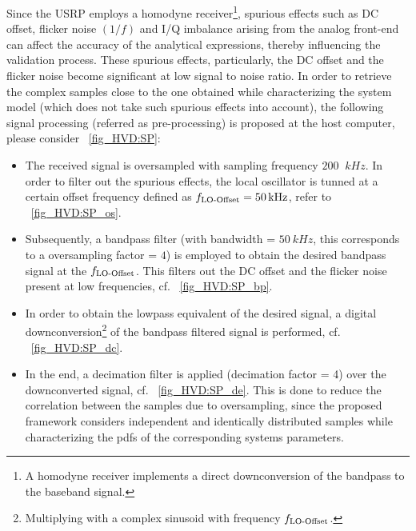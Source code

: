 Since the USRP employs a homodyne receiver\footnote{A homodyne receiver implements a direct downconversion of the bandpass to the baseband signal.}, spurious effects such as DC offset, flicker noise $(1/f)$ and I/Q imbalance arising from the analog front-end can affect the accuracy of the analytical expressions, thereby influencing the validation process. These spurious effects, particularly, the DC offset and the flicker noise become significant at low signal to noise ratio. In order to retrieve the complex samples close to the one obtained while characterizing the system model (which does not take such spurious effects into account), the following signal processing (referred as pre-processing) is proposed at the host computer, please consider \figurename~\ref{fig_HVD:SP}:
\begin{itemize}
\item The received signal is oversampled with sampling frequency $200$ $\SI{}{kHz}$. 
In order to filter out the spurious effects, the local oscillator is tunned at a certain offset frequency defined as $f_{\text{LO-Offset}} = \SI{50}{kHz}$, refer to \figurename~\ref{fig_HVD:SP_os}. 
\item Subsequently, a bandpass filter (with bandwidth = $\SI{50}{kHz}$, this corresponds to a oversampling factor = $4$) is employed to obtain the desired bandpass signal at the $f_{\text{LO-Offset}}$. This filters out the DC offset and the flicker noise present at low frequencies, cf. \figurename~\ref{fig_HVD:SP_bp}. 
\item In order to obtain the lowpass equivalent of the desired signal, a digital downconversion\footnote{Multiplying with a complex sinusoid with frequency $f_{\text{LO-Offset}}$.} of the bandpass filtered signal is performed, cf. \figurename~\ref{fig_HVD:SP_dc}. %
\item In the end, a decimation filter is applied (decimation factor = 4) over the downconverted signal, cf. \figurename~\ref{fig_HVD:SP_de}. This is done to reduce the correlation between the samples due to oversampling, since the proposed framework considers independent and identically distributed samples while characterizing the pdfs of the corresponding systems parameters. 
\end{itemize}

